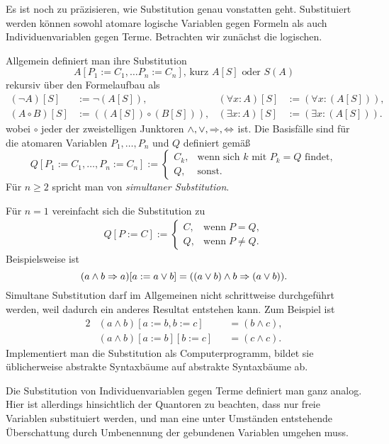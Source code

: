 Es ist noch zu präzisieren, wie Substitution genau vonstatten geht.
Substituiert werden können sowohl atomare logische Variablen gegen
Formeln als auch Individuenvariablen gegen Terme. Betrachten wir
zunächst die logischen.

Allgemein definiert man ihre Substitution
\[A[P_1:=C_1,\ldots P_n:=C_n],\,\text{kurz $A[S]$ oder $S(A)$}\]
rekursiv über den Formelaufbau als
\begin{align*}
(\lnot A)[S] &:= \lnot (A[S]), & (\forall x\colon A)[S] &:= (\forall x\colon (A[S])),\\
(A\circ B)[S] &:= ((A[S])\circ (B[S])), & (\exists x\colon A)[S] &:= (\exists x\colon (A[S])).
\end{align*}
wobei $\circ$ jeder der zweistelligen Junktoren
$\land,\lor,\Rightarrow,\Leftrightarrow$ ist. Die Basisfälle sind für die atomaren
Variablen $P_1,\ldots, P_n$ und $Q$ definiert gemäß
\[Q[P_1:=C_1, \ldots, P_n:=C_n] := \begin{cases}
C_k, & \text{wenn sich $k$ mit $P_k=Q$ findet},\\
Q, & \text{sonst}.
\end{cases}\]
Für $n\ge 2$ spricht man von \emph{simultaner Substitution}.

Für $n=1$ vereinfacht sich die Substitution zu
\begin{align*}
Q[P:=C] := \begin{cases}
C, & \text{wenn}\;P=Q,\\
Q, & \text{wenn}\;P\ne Q.
\end{cases}
\end{align*}
Beispielsweise ist
\[(a\land b\Rightarrow a)[a:=a\lor b] = ((a\lor b)\land b\Rightarrow (a\lor b)).\]
Simultane Substitution darf im Allgemeinen nicht schrittweise
durchgeführt werden, weil dadurch ein anderes Resultat entstehen kann.
Zum Beispiel ist
\begin{alignat*}{2}
& (a\land b)[a:=b,b:=c] &&= (b\land c),\\
& (a\land b)[a:=b][b:=c] &&= (c\land c).
\end{alignat*}
Implementiert man die Substitution als Computerprogramm, bildet sie
üblicherweise abstrakte Syntaxbäume auf abstrakte Syntaxbäume ab.

Die Substitution von Individuenvariablen gegen Terme definiert man
ganz analog. Hier ist allerdings hinsichtlich der Quantoren zu beachten,
dass nur freie Variablen substituiert werden, und man eine unter
Umständen entstehende Überschattung durch Umbenennung der gebundenen
Variablen umgehen muss.

